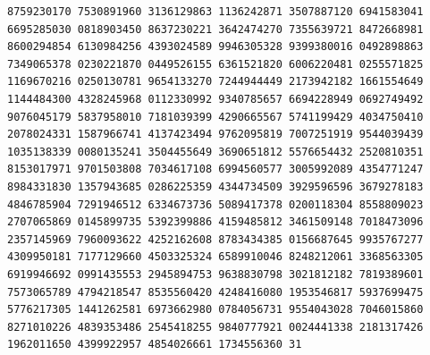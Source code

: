\begin{Verbatim}[fontsize=\fontsize{6.4}{7.3}\selectfont]
8759230170 7530891960 3136129863 1136242871 3507887120 6941583041 6695285030 0818903450 8637230221 3642474270 7355639721 8472668981
8600294854 6130984256 4393024589 9946305328 9399380016 0492898863 7349065378 0230221870 0449526155 6361521820 6006220481 0255571825
1169670216 0250130781 9654133270 7244944449 2173942182 1661554649 1144484300 4328245968 0112330992 9340785657 6694228949 0692749492
9076045179 5837958010 7181039399 4290665567 5741199429 4034750410 2078024331 1587966741 4137423494 9762095819 7007251919 9544039439
1035138339 0080135241 3504455649 3690651812 5576654432 2520810351 8153017971 9701503808 7034617108 6994560577 3005992089 4354771247
8984331830 1357943685 0286225359 4344734509 3929596596 3679278183 4846785904 7291946512 6334673736 5089417378 0200118304 8558809023
2707065869 0145899735 5392399886 4159485812 3461509148 7018473096 2357145969 7960093622 4252162608 8783434385 0156687645 9935767277
4309950181 7177129660 4503325324 6589910046 8248212061 3368563305 6919946692 0991435553 2945894753 9638830798 3021812182 7819389601
7573065789 4794218547 8535560420 4248416080 1953546817 5937699475 5776217305 1441262581 6973662980 0784056731 9554043028 7046015860
8271010226 4839353486 2545418255 9840777921 0024441338 2181317426 1962011650 4399922957 4854026661 1734556360 31
\end{Verbatim}
